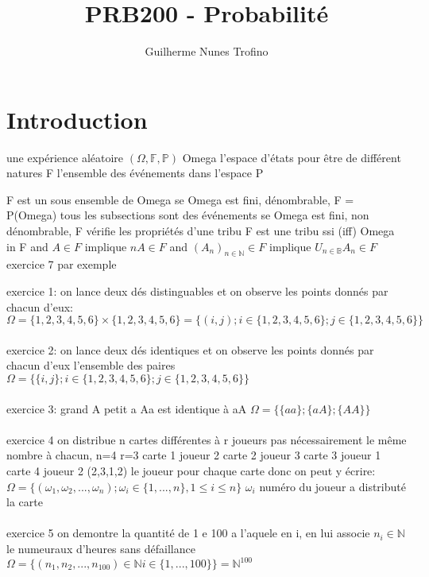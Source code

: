 \documentclass{article}
\title{PRB200 - Probabilité}
\author{Guilherme Nunes Trofino}
\begin{document}
\maketitle

\newpage\tableofcontents

\section{Introduction}
une expérience aléatoire 
$ (\Omega, \mathbb{F}, \mathbb{P})$
Omega l'espace d'états pour être de différent natures
F l'ensemble des événements dans l'espace
P

F est un sous ensemble de Omega  
se Omega est fini, dénombrable, F = P(Omega) tous les subsections sont des événements
se Omega est fini, non dénombrable, F vérifie les propriétés d'une tribu F est une tribu ssi (iff) Omega in F and $A \in F$ implique $nA \in F$ and $(A_n)_{n\in\mathbb{N}} \in F$ implique $U_{n\in\mathbb{B}}A_n \in F$ exercice 7 par exemple


exercice 1:
on lance deux dés distinguables et on observe les points donnés par chacun d'eux:
$\Omega = \{ 1,2,3,4,5,6 \} \times \{ 1,2,3,4,5,6 \} = \{ (i,j); i \in \{1,2,3,4,5,6\}; j \in \{ 1,2,3,4,5,6 \} \}$
\\\\
exercice 2:
on lance deux dés identiques et on observe les points donnés par chacun d'eux
l'ensemble des paires
$\Omega = \{ \{i,j\}; i \in \{1,2,3,4,5,6\}; j \in \{ 1,2,3,4,5,6 \} \}$
\\\\
exercice 3:
grand A petit a
Aa est identique à aA
$\Omega = \{ \{ aa \}; \{ aA \}; \{ AA \} \}$
\\\\
exercice 4
on distribue n cartes différentes à r joueurs pas nécessairement le même nombre à chacun, 
n=4 r=3
carte 1 joueur 2
carte 2 joueur 3
carte 3 joueur 1
carte 4 joueur 2
(2,3,1,2) le joueur pour chaque carte donc on peut y écrire:
$\Omega = \{ (\omega_1, \omega_2, ..., \omega_n); \omega_i \in \{ 1, ..., n \}, 1 \leq i \leq n \}$
$\omega_i$ numéro du joueur a distributé la carte
\\\\

exercice 5
on demontre la quantité de 1 e 100 a l'aquele en i, en lui associe $n_i \in \mathbb{N}$ le numeuraux d'heures sans défaillance
$\Omega = \{ (n_1, n_2, ..., n_{100}) \in \mathbb{N} i\in\{1, ..., 100\}\} = \mathbb{N}^{100}$
\\\\
\end{document}
